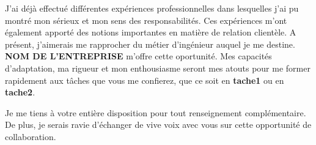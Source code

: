 \documentclass[11pt, a4paper]{awesome-cv}
\begin{document}
\begin{cvletter}
J'ai déjà effectué différentes expériences professionnelles dans lesquelles j'ai pu montré mon sérieux et mon sens des responsabilités. Ces expériences m'ont également apporté des notions importantes en matière de relation clientèle. A présent, j'aimerais me rapprocher du métier d'ingénieur auquel je me destine. \textbf{NOM DE L'ENTREPRISE} m'offre cette oportunité. Mes capacités d'adaptation, ma rigueur et mon enthousiasme seront mes atouts pour me former rapidement aux tâches que vous me confierez, que ce soit en \textbf{tache1} ou en \textbf{tache2}.


\vspace{5mm}

Je me tiens à votre entière disposition pour tout renseignement complémentaire. De plus, je serais ravie d'échanger de vive voix avec vous sur cette opportunité de collaboration.

\end{cvletter}


\makeletterclosing
\end{document}
